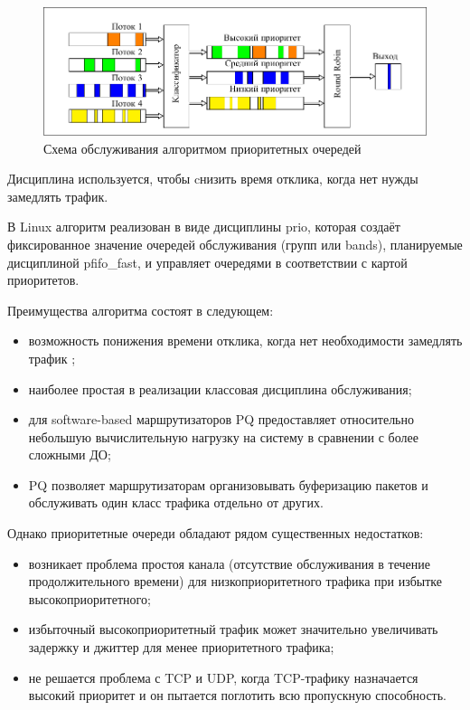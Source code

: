     \begin{figure}[ht!]
        \center
        \includegraphics[scale=1.3]{pdfimages/pq.pdf}
        \caption{Схема обслуживания алгоритмом приоритетных очередей}
		\label{pic:pq}
    \end{figure}

    Дисциплина используется, чтобы cнизить время отклика, когда нет нужды замедлять трафик\cite{tcprio}. 

    В Linux алгоритм реализован в виде дисциплины prio, которая создаёт фиксированное
    значение очередей обслуживания (групп или bands), планируемые дисциплиной pfifo\_fast,
	и управляет очередями в соответствии с картой приоритетов.\cite{tcprio}



    Преимущества алгоритма состоят в следующем:
    \begin{itemize}
		\item возможность понижения времени отклика, когда нет необходимости замедлять трафик \cite{tcprio};
        \item наиболее простая в реализации классовая дисциплина обслуживания;
        \item для software-based маршрутизаторов PQ предоставляет относительно небольшую
             вычислительную нагрузку на систему в сравнении с более сложными ДО;
        \item PQ позволяет маршрутизаторам организовывать буферизацию пакетов и обслуживать
             один класс трафика отдельно от других. \cite{suppdiff}
    \end{itemize}

    Однако приоритетные очереди обладают рядом существенных недостатков:
    \begin{itemize}
        \item возникает проблема простоя канала (отсутствие обслуживания в течение продолжительного времени)
			  для низкоприоритетного трафика при избытке высокоприоритетного\cite{packethandling};
        \item избыточный высокоприоритетный трафик может значительно увеличивать
                задержку и джиттер для менее приоритетного трафика;
        \item не решается проблема с TCP и UDP, когда TCP-трафику назначается высокий приоритет и он
                пытается поглотить всю пропускную способность. \cite{suppdiff}
    \end{itemize}

